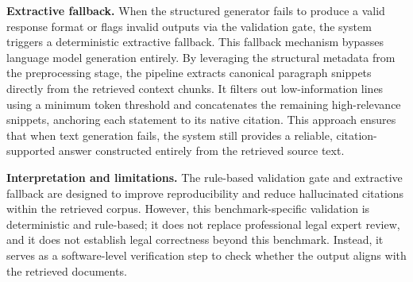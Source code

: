 \textbf{Extractive fallback.} When the structured generator fails to produce a valid response format or flags invalid outputs via the validation gate, the system triggers a deterministic extractive fallback. This fallback mechanism bypasses language model generation entirely. By leveraging the structural metadata from the preprocessing stage, the pipeline extracts canonical paragraph snippets directly from the retrieved context chunks. It filters out low-information lines using a minimum token threshold and concatenates the remaining high-relevance snippets, anchoring each statement to its native citation. This approach ensures that when text generation fails, the system still provides a reliable, citation-supported answer constructed entirely from the retrieved source text.

\textbf{Interpretation and limitations.} The rule-based validation gate and extractive fallback are designed to improve reproducibility and reduce hallucinated citations within the retrieved corpus. However, this benchmark-specific validation is deterministic and rule-based; it does not replace professional legal expert review, and it does not establish legal correctness beyond this benchmark. Instead, it serves as a software-level verification step to check whether the output aligns with the retrieved documents.

\FloatBarrier
